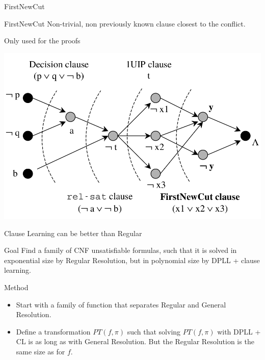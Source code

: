 \documentclass[page number]{beamer}
\begin{document}
\begin{frame}{FirstNewCut}
  \begin{exampleblock}{FirstNewCut}
    Non-trivial, non previously known clause closest to the conflict.
  \end{exampleblock}
  \vfill
  \begin{alertblock}{Only used for the proofs}
  \end{alertblock}
  \vfill
  \begin{center}
    \includegraphics[scale=0.28]{cut.png}
  \end{center}
\end{frame}

\begin{frame}{Clause Learning can be better than Regular}
  \begin{exampleblock}{Goal}
    Find a family of CNF unsatisfiable formulas, such that it is solved in exponential size by Regular Resolution, but in polynomial size by DPLL + clause learning.
  \end{exampleblock}
  \vfill
  \begin{block}{Method}
    \begin{itemize}
    \item Start with a family of function that separates Regular and General Resolution.
    \item Define a transformation $PT(f,\pi)$ such that solving $PT(f,\pi)$ with DPLL + CL is as long as with General Resolution. But the Regular Resolution is the same size as for $f$.
    \end{itemize}
  \end{block}
      
\end{frame}
\end{document}
